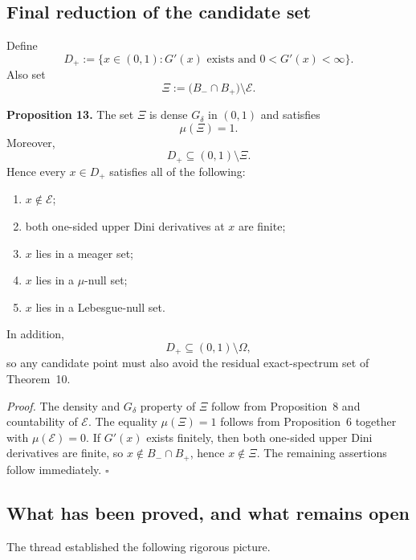\subsection{Final reduction of the candidate set}

Define
\[
D_+:=\{x\in(0,1):G'(x)\text{ exists and }0<G'(x)<\infty\}.
\]
Also set
\[
\Xi:=\bigl(B_-\cap B_+\bigr)\setminus\mathcal E.
\]

\noindent\textbf{Proposition 13.}
The set $\Xi$ is dense $G_\delta$ in $(0,1)$ and satisfies
\[
\mu(\Xi)=1.
\]
Moreover,
\[
D_+\subseteq (0,1)\setminus\Xi.
\]
Hence every $x\in D_+$ satisfies all of the following:
\begin{enumerate}
\item $x\notin\mathcal E$;
\item both one-sided upper Dini derivatives at $x$ are finite;
\item $x$ lies in a meager set;
\item $x$ lies in a $\mu$-null set;
\item $x$ lies in a Lebesgue-null set.
\end{enumerate}
In addition,
\[
D_+\subseteq (0,1)\setminus\Omega,
\]
so any candidate point must also avoid the residual exact-spectrum set of Theorem~10.

\medskip
\noindent\textit{Proof.}
The density and $G_\delta$ property of $\Xi$ follow from Proposition~8 and countability of $\mathcal E$. The equality $\mu(\Xi)=1$ follows from Proposition~6 together with $\mu(\mathcal E)=0$. If $G'(x)$ exists finitely, then both one-sided upper Dini derivatives are finite, so $x\notin B_-\cap B_+$, hence $x\notin\Xi$. The remaining assertions follow immediately. \hfill$\square$

\subsection{What has been proved, and what remains open}

The thread established the following rigorous picture.


